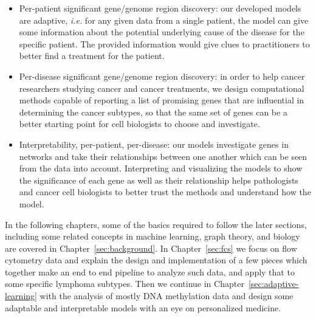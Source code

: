 \begin{itemize}
  \item Per-patient significant gene/genome region discovery: our developed
    models are adaptive, \emph{i.e.} for any given data from a single patient,
    the model can give some information about the potential underlying cause of
    the disease for the specific patient. The provided information would give
    clues to practitioners to better find a treatment for the patient.
  \item Per-disease significant gene/genome region discovery: in order to help
    cancer researchers studying cancer and cancer treatments, we design
    computational methods capable of reporting a list of promising genes that
    are influential in determining the cancer subtypes, so that the same set of
    genes can be a better starting point for cell biologists to choose and
    investigate.
  \item Interpretability, per-patient, per-disease: our models investigate
    genes in networks and take their relationships between one another which
    can be seen from the data into account. Interpreting and visualizing the
    models to show the significance of each gene as well as their relationship
    helps pathologists and cancer cell biologists to better trust the methods
    and understand how the model.
\end{itemize}

In the following chapters, some of the basics required to follow the later
sections, including some related concepts in machine learning, graph theory,
and biology are covered in Chapter~\ref{sec:background}. In
Chapter~\ref{sec:fcs} we focus on flow cytometry data and explain the design
and implementation of a few pieces which together make an end to end pipeline
to analyze such data, and apply that to some specific lymphoma subtypes. Then
we continue in Chapter~\ref{sec:adaptive-learning} with the analysis of mostly
DNA methylation data and design some adaptable and interpretable models with an
eye on personalized medicine.

